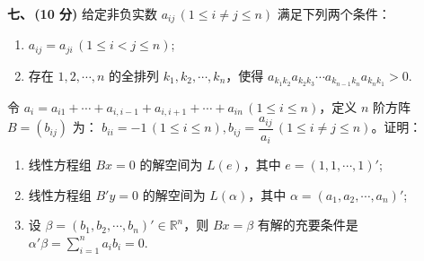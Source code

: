 \textbf{七、\,(10 分)}
给定非负实数 $a_{ij}\,(1 \le i \neq j \le n)$ 满足下列两个条件：
\begin{enumerate}
    \item[(i)] $a_{ij} = a_{ji}\,(1 \le i < j \le n)$;
    \item[(ii)] 存在 $1, 2, \cdots, n$ 的全排列 $k_1, k_2, \cdots, k_n$，使得 $a_{k_1k_2} a_{k_2k_3} \cdots a_{k_{n-1}k_n} a_{k_nk_1} > 0$.
\end{enumerate}
令 $a_i = a_{i1} + \cdots + a_{i,i-1} + a_{i,i+1} + \cdots + a_{in} \, (1 \le i \le n)$，定义 $n$ 阶方阵 $B=(b_{ij})$ 为：
$b_{ii} = -1 \, (1 \le i \le n), b_{ij} = \dfrac{a_{ij}}{a_i} \, (1 \le i \neq j \le n)$。证明：

\begin{enumerate}[label=(\arabic*)]
    \item 线性方程组 $Bx = 0$ 的解空间为 $L(e)$，其中 $e = (1, 1, \cdots, 1)'$;
    \item 线性方程组 $B'y = 0$ 的解空间为 $L(\alpha)$，其中 $\alpha = (a_1, a_2, \cdots, a_n)'$;
    \item 设 $\beta = (b_1, b_2, \cdots, b_n)' \in \mathbb{R}^n$，则 $Bx = \beta$ 有解的充要条件是 $\alpha'\beta = \sum\limits_{i=1}^n a_i b_i = 0$.
\end{enumerate}